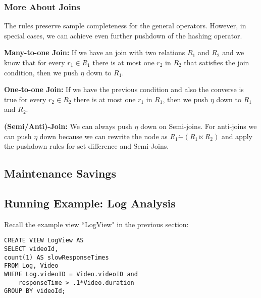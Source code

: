 \subsubsection{More About Joins} 
The rules preserve sample completeness for the general operators. 
However, in special cases, we can achieve even further pushdown of the hashing operator. 

\textbf{Many-to-one Join: } If we have an join with two relations $R_1$ and $R_2$ and we know that for every $r_1 \in R_1$ there is at most one $r_2$ in $R_2$ that satisfies the join condition, then we push $\eta$ down to $R_1$.

\textbf{One-to-one Join: } If we have the previous condition and also the converse is true for every $r_2 \in R_2$ there is at most one $r_1$ in $R_1$, then we push $\eta$ down to $R_1$ and $R_2$.

\textbf{(Semi/Anti)-Join: } We can always push $\eta$ down on Semi-joins. For anti-joins we can push $\eta$ down because we can rewrite the node as $R_1 \dot{-} (R_1 \ltimes R_2) $ and apply the pushdown rules for set difference and Semi-Joins.

\subsection{Maintenance Savings}

\subsection{Running Example: Log Analysis}
Recall the example view ``LogView" in the previous section:
\begin{lstlisting} 
CREATE VIEW LogView AS 
SELECT videoId, 
count(1) AS slowResponseTimes 
FROM Log, Video
WHERE Log.videoID = Video.videoID and
    responseTime > .1*Video.duration
GROUP BY videoId;
\end{lstlisting}

